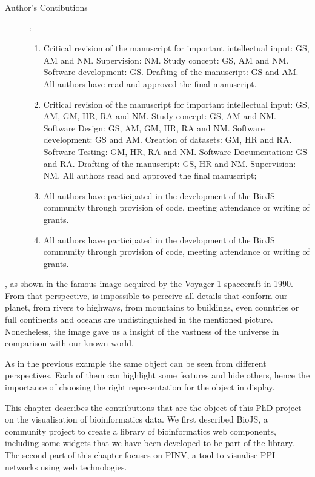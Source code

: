 \begin{description}
	\item[Author's Contibutions]:\\
		\begin{enumerate}
			\item Critical revision of the manuscript for important intellectual input: GS, AM and NM. Supervision: NM. Study concept: GS, AM and NM. Software development: GS. Drafting of the manuscript: GS and AM. All authors have read and approved the final manuscript.
			\item Critical revision of the manuscript for important intellectual input: GS, AM, GM, HR, RA and NM. Study concept: GS, AM and NM. Software Design: GS, AM, GM, HR, RA and NM. Software development: GS and AM. Creation of datasets: GM, HR and RA. Software Testing: GM, HR, RA and NM. Software Documentation: GS and RA. Drafting of the manuscript: GS, HR and NM. Supervision: NM. All authors read and approved the final manuscript;
			\item All authors have participated in the development of the BioJS community through provision of code, meeting attendance or writing of grants.
			\item All authors have participated in the development of the BioJS community through provision of code, meeting attendance or writing of grants.
		\end{enumerate}
\end{description}
\newpage
{}, as shown in the famous image acquired by the Voyager 1 spacecraft in 1990. From that perspective, is impossible to perceive all details that conform our planet, from rivers to highways, from mountains to buildings, even countries or full continents and oceans are undistinguished in the mentioned picture. Nonetheless, the image gave us a insight of the vastness of the universe in comparison with our known world.

As in the previous example the same object can be seen from different perspectives. Each of them can highlight some features and hide others, hence the importance of choosing the right representation for the object in display.

This chapter describes the contributions that are the object of this PhD project on the visualisation of bioinformatics data. We first described BioJS, a community project to create a library of bioinformatics web components, including some widgets that we have been developed to be part of the library. The second part of this chapter focuses on PINV, a tool to visualise PPI networks using web technologies.



